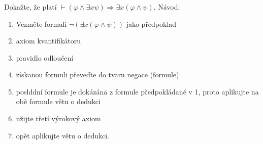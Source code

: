 \subsubsection{}
Dokažte, že platí $\vdash (\varphi \wedge \exists x \psi) \Rightarrow \exists
x(\varphi \wedge \psi)$. Návod:

\begin{enumerate}
  \item Vezměte formuli $\neg ( \exists x(\varphi \wedge \psi))$ jako předpoklad
  \item axiom kvantifikátoru
  \item pravidlo odloučení
  \item získanou formuli převeďte do tvaru negace (formule)
  \item poslddní formule je dokázána z formule předpokládané v 1, proto
  aplikujte na obě formule větu o dedukci
  \item užijte třetí výrokový axiom
  \item opět aplikujte větu o dedukci.
\end{enumerate}
